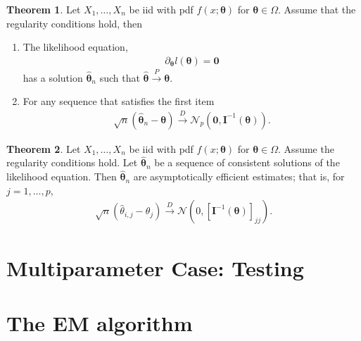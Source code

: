 \documentclass{book}
\theoremstyle{definition}
\newtheorem{thm}{Theorem}[section]
\newcommand{\p}{\partial}
\newcommand{\N}{\mathcal{N}}
\begin{document}
\begin{thm}
	Let $X_1,\dots,X_n$ be iid with pdf $f(x;\bm\theta)$ for $\bm\theta \in \Omega$. Assume that the regularity conditions hold, then 
	\begin{enumerate}
		\item The likelihood equation, 
		\begin{align}
		\p_{\bm\theta} l(\bm\theta) = \mathbf{0}
		\end{align}
		has a solution $\hat{\bm\theta}_n$ such that $\hat{\bm\theta} \xrightarrow{P} \bm\theta$. 
		
		\item For any sequence that satisfies the first item 
		\begin{align}
		\sqrt{n} (\hat{\bm\theta}_n - \bm\theta) \xrightarrow{D} \N_p (\mathbf{0}, \mathbf{I}^{-1}(\bm\theta) ).
		\end{align}
	\end{enumerate}
\end{thm}


\begin{thm}
	Let $X_1,\dots,X_n$ be iid with pdf $f(x;\bm\theta)$ for $\bm\theta \in \Omega$. Assume the regularity conditions hold. Let $\hat{\bm\theta}_n$ be a sequence of consistent solutions of the likelihood equation. Then $\hat{\bm\theta}_n$ are asymptotically efficient estimates; that is, for $j = 1,\dots,p$,
	\begin{align}
	\sqrt{n}(\hat\theta_{i,j} - \theta_j) \xrightarrow{D} \N(0, [\mathbf{I}^{-1}(\bm\theta)]_{jj}).
	\end{align}
\end{thm}




 


















\section{Multiparameter Case: Testing}
\section{The EM algorithm}
\end{document}
